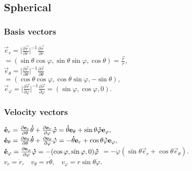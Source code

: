 \subsection{Spherical}



\subsubsection*{Basis vectors}
$\vec{e}_r=\Big|\frac{\partial \vec{r}}{\partial r}\Big|^{-1}\frac{\partial \vec{r}}{\partial r}$\\
$=(\sin\theta\cos\varphi,\sin\theta\sin\varphi,\cos\theta)=\frac{\vec{r}}{r},$\\
$\vec{e}_\theta=\Big|\frac{\partial \vec{r}}{\partial \theta}\Big|^{-1}\frac{\partial \vec{r}}{\partial \theta}$\\
$=(\cos\theta\cos\varphi,\cos\theta\sin\varphi,-\sin\theta),$\\
$\vec{e}_\varphi=\Big|\frac{\partial \vec{r}}{\partial \varphi}\Big|^{-1}\frac{\partial \vec{r}}{\partial \varphi}=(\sin\varphi,\cos\varphi,0).$



\subsubsection*{Velocity vectors}
$\accentset{\mbox{\bfseries .}}{\mathbf{e}}_r=\pdv{\mathbf{e}_r}{\theta}\accentset{\mbox{\bfseries .}}{\theta}+\pdv{\mathbf{e}_r}{\varphi}\accentset{\mbox{\bfseries .}}{\varphi}=\accentset{\mbox{\bfseries .}}{\theta}\mathbf{e}_\theta+\sin\theta \accentset{\mbox{\bfseries .}}{\varphi}\mathbf{e}_\varphi,$\\
$\accentset{\mbox{\bfseries .}}{\mathbf{e}}_\theta  =\pdv{\mathbf{e}_\theta}{\theta}\accentset{\mbox{\bfseries .}}{\theta}+\pdv{\mathbf{e}_\theta}{\varphi}\accentset{\mbox{\bfseries .}}{\varphi}=-\accentset{\mbox{\bfseries .}}{\theta}\mathbf{e}_r+\cos\theta \accentset{\mbox{\bfseries .}}{\varphi}\mathbf{e}_\varphi,$\\
$\accentset{\mbox{\bfseries .}}{\mathbf{e}}_\varphi=\pdv{\mathbf{e}_\varphi}{\varphi}\accentset{\mbox{\bfseries .}}{\varphi}=-(\cos\varphi,\sin\varphi,0)\accentset{\mbox{\bfseries .}}{\varphi}$
$=-\dot{\varphi}(\sin\theta\vec{e}_r+\cos\theta\vec{e}_\theta).$\\
$v_r=\dot{r},\ \ \ \ v_\theta=r\dot{\theta},\ \ \ \ v_\varphi=r\sin\theta\dot{\varphi}.$



